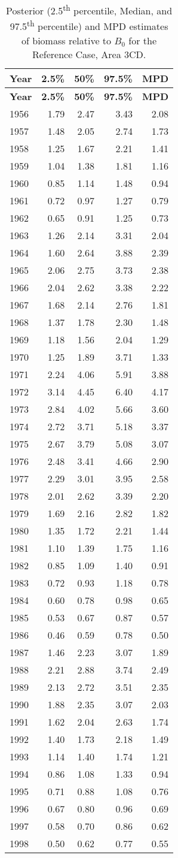 \documentclass[11pt]{book}
\begin{document}
\begin{longtable}[]{@{}lrrrr@{}}
\caption{\label{tab:tab-post-depl-3cd}Posterior (2.5\textsuperscript{th} percentile, Median, and 97.5\textsuperscript{th} percentile) and MPD estimates of biomass relative to \(B_0\) for the Reference Case, Area 3CD.}\tabularnewline
\toprule
\textbf{Year} & \textbf{2.5\%} & \textbf{50\%} & \textbf{97.5\%} & \textbf{MPD}\tabularnewline
\midrule
\endfirsthead
\toprule
\textbf{Year} & \textbf{2.5\%} & \textbf{50\%} & \textbf{97.5\%} & \textbf{MPD}\tabularnewline
\midrule
\endhead
1956 & 1.79 & 2.47 & 3.43 & 2.08\tabularnewline
1957 & 1.48 & 2.05 & 2.74 & 1.73\tabularnewline
1958 & 1.25 & 1.67 & 2.21 & 1.41\tabularnewline
1959 & 1.04 & 1.38 & 1.81 & 1.16\tabularnewline
1960 & 0.85 & 1.14 & 1.48 & 0.94\tabularnewline
1961 & 0.72 & 0.97 & 1.27 & 0.79\tabularnewline
1962 & 0.65 & 0.91 & 1.25 & 0.73\tabularnewline
1963 & 1.26 & 2.14 & 3.31 & 2.04\tabularnewline
1964 & 1.60 & 2.64 & 3.88 & 2.39\tabularnewline
1965 & 2.06 & 2.75 & 3.73 & 2.38\tabularnewline
1966 & 2.04 & 2.62 & 3.38 & 2.22\tabularnewline
1967 & 1.68 & 2.14 & 2.76 & 1.81\tabularnewline
1968 & 1.37 & 1.78 & 2.30 & 1.48\tabularnewline
1969 & 1.18 & 1.56 & 2.04 & 1.29\tabularnewline
1970 & 1.25 & 1.89 & 3.71 & 1.33\tabularnewline
1971 & 2.24 & 4.06 & 5.91 & 3.88\tabularnewline
1972 & 3.14 & 4.45 & 6.40 & 4.17\tabularnewline
1973 & 2.84 & 4.02 & 5.66 & 3.60\tabularnewline
1974 & 2.72 & 3.71 & 5.18 & 3.37\tabularnewline
1975 & 2.67 & 3.79 & 5.08 & 3.07\tabularnewline
1976 & 2.48 & 3.41 & 4.66 & 2.90\tabularnewline
1977 & 2.29 & 3.01 & 3.95 & 2.58\tabularnewline
1978 & 2.01 & 2.62 & 3.39 & 2.20\tabularnewline
1979 & 1.69 & 2.16 & 2.82 & 1.82\tabularnewline
1980 & 1.35 & 1.72 & 2.21 & 1.44\tabularnewline
1981 & 1.10 & 1.39 & 1.75 & 1.16\tabularnewline
1982 & 0.85 & 1.09 & 1.40 & 0.91\tabularnewline
1983 & 0.72 & 0.93 & 1.18 & 0.78\tabularnewline
1984 & 0.60 & 0.78 & 0.98 & 0.65\tabularnewline
1985 & 0.53 & 0.67 & 0.87 & 0.57\tabularnewline
1986 & 0.46 & 0.59 & 0.78 & 0.50\tabularnewline
1987 & 1.46 & 2.23 & 3.07 & 1.89\tabularnewline
1988 & 2.21 & 2.88 & 3.74 & 2.49\tabularnewline
1989 & 2.13 & 2.72 & 3.51 & 2.35\tabularnewline
1990 & 1.88 & 2.35 & 3.07 & 2.03\tabularnewline
1991 & 1.62 & 2.04 & 2.63 & 1.74\tabularnewline
1992 & 1.40 & 1.73 & 2.18 & 1.49\tabularnewline
1993 & 1.14 & 1.40 & 1.74 & 1.21\tabularnewline
1994 & 0.86 & 1.08 & 1.33 & 0.94\tabularnewline
1995 & 0.71 & 0.88 & 1.08 & 0.76\tabularnewline
1996 & 0.67 & 0.80 & 0.96 & 0.69\tabularnewline
1997 & 0.58 & 0.70 & 0.86 & 0.62\tabularnewline
1998 & 0.50 & 0.62 & 0.77 & 0.55\tabularnewline

\end{longtable}
\end{document}
